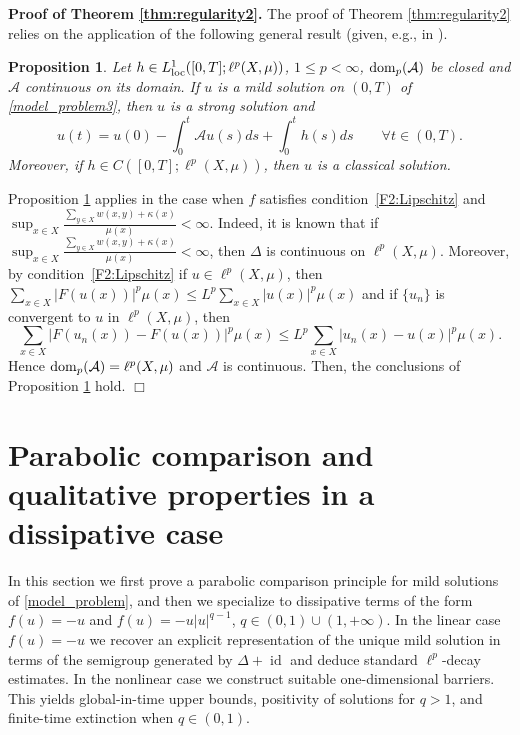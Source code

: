 \documentclass[journal]{article}
\theoremstyle{nonitalic}
\theoremstyle{nonitalic}
\theoremstyle{plain} %
\newtheorem{proposition}[theorem]{Proposition}
\numberwithin{equation}{section}
\begin{document}
 \textbf{Proof of Theorem \ref{thm:regularity2}.}
The proof of Theorem \ref{thm:regularity2} relies on the application of the following general result (given, e.g., in \cite[Theorem 1.6]{benilan1988evolution}). 

\begin{proposition}\label{Prop-strongclassical}
Let $h\in L^1_{\rm loc}([0,T];\ell^p(X,\mu))$, $1\leq p<\infty$, ${\rm{dom}}_p(\mathcal A)$ be closed and $\mathcal A$ continuous on its domain. If $u$ is a mild solution on $(0,T)$ of \eqref{model_problem3}, then $u$ is a strong solution and 
$$
u(t)=u(0)-\int_0^t\mathcal Au(s)ds+\int_0^th(s)ds\qquad \forall t\in (0,T).
$$
Moreover, if $h\in C([0,T];\ell^p(X,\mu))$, then $u$ is a classical solution. 
\end{proposition}
Proposition \ref{Prop-strongclassical} applies in the case when $f$ satisfies condition~\ref{F2:Lipschitz} and $\sup_{x\in X}\frac{\sum_{y\in X}w(x,y)+\kappa(x)}{\mu(x)}<\infty$. Indeed, it is known \cite[Theorem 2.15]{keller2021graphs} that if $\sup_{x\in X}\frac{\sum_{y\in X}w(x,y)+\kappa(x)}{\mu(x)}<\infty$, then $\Delta$ is continuous on $\ell^p(X,\mu)$. Moreover, by condition~\ref{F2:Lipschitz} if $u\in \ell^p(X,\mu)$, then $\sum_{x\in X}|F(u(x))|^p\mu(x)\leq L^p \sum_{x\in X}|u(x)|^p\mu(x)$ and if $\{u_n\}$ is convergent to $u$ in $\ell^p(X,\mu)$, then 
$$
\sum_{x\in X}|F(u_n(x))-F(u(x))|^p\mu(x)\leq L^p \sum_{x\in X}|u_n(x)-u(x)|^p\mu(x).
$$
Hence ${\rm{dom}}_p(\mathcal A)=\ell^p(X,\mu)$ and $\mathcal A$ is continuous.  Then, the conclusions of Proposition \ref{Prop-strongclassical} hold. $\Box$



 

 





\section{Parabolic comparison and qualitative  properties in a dissipative case}\label{s: specificnonlinearity}


In this section we first prove a parabolic comparison principle for mild solutions of
\ref{model_problem}, and then we specialize to dissipative terms of the form $f(u)=-u$ and $f(u)=-u|u|^{q-1}$, $q\in(0,1)\cup(1,+\infty)$. In the linear case $f(u)=-u$ we recover an explicit representation of the unique mild solution in terms of the semigroup generated by $\Delta+\operatorname{id}$ and deduce standard $\ell^p$-decay estimates. In the nonlinear case we  construct suitable one-dimensional barriers. This yields global-in-time upper bounds, positivity of solutions for $q>1$, and finite-time extinction when $q\in(0,1)$.
\end{document}
